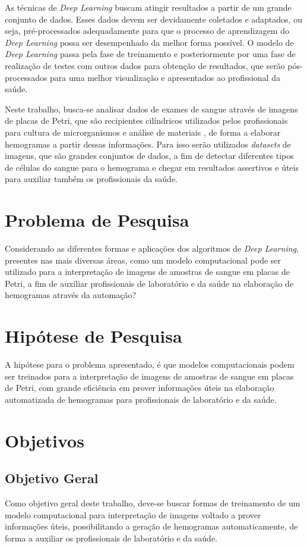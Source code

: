 As técnicas de \emph{Deep Learning} buscam atingir resultados a partir de um grande conjunto de dados. Esses dados devem ser devidamente coletados e adaptados, ou seja, pré-processados adequadamente para que o processo de aprendizagem do \emph{Deep Learning} possa ser desempenhado da melhor forma possível. O modelo de \emph{Deep Learning} passa pela fase de treinamento e posteriormente por uma fase de realização de testes com outros dados para obtenção de resultados, que serão pós-processados para uma melhor visualização e apresentados ao profissional da saúde.

Neste trabalho, busca-se analisar dados de exames de sangue através de imagens de placas de Petri, que são recipientes cilíndricos utilizados pelos profissionais para cultura de microrganismos e análise de materiais \cite{petri}, de forma a elaborar hemogramas a partir dessas informações. Para isso serão utilizados \emph{datasets} de imagens, que são grandes conjuntos de dados, a fim de detectar diferentes tipos de células do sangue para o hemograma e chegar em resultados assertivos e úteis para auxiliar também os profissionais da saúde.

\section{Problema de Pesquisa}
\label{sec:problema}
Considerando as diferentes formas e aplicações dos algoritmos de \emph{Deep Learning}, presentes nas mais diversas áreas, como um modelo computacional pode ser utilizado para a interpretação de imagens de amostras de sangue em placas de Petri, a fim de auxiliar profissionais de laboratório e da saúde na elaboração de hemogramas através da automação?

\section{Hipótese de Pesquisa}
\label{sec:hipotese}
A hipótese para o problema apresentado, é que modelos computacionais podem ser treinados para a interpretação de imagens de amostras de sangue em placas de Petri, com grande eficiência em prover informações úteis na elaboração automatizada de hemogramas para profissionais de laboratório e da saúde.

\section{Objetivos}
\label{sec:objetivos}

\subsection{Objetivo Geral}
Como objetivo geral deste trabalho, deve-se buscar formas de treinamento de um modelo computacional para interpretação de imagens voltado a prover informações úteis, possibilitando a geração de hemogramas automaticamente, de forma a auxiliar os profissionais de laboratório e da saúde.

